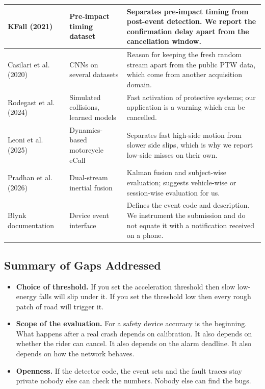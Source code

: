 \documentclass[10pt,a4paper]{article}
\begin{document}
\begin{longtable}{|>{\raggedright\arraybackslash}p{.19\linewidth}|>{\raggedright\arraybackslash}p{.23\linewidth}|>{\raggedright\arraybackslash}p{.49\linewidth}|}
KFall (2021)~\cite{kfall} & Pre-impact timing dataset & Separates pre-impact timing from post-event detection. We report the confirmation delay apart from the cancellation window.\\\hline
Casilari et al. (2020)~\cite{cnn} & CNNs on several datasets & Reason for keeping the fresh random stream apart from the public PTW data, which come from another acquisition domain.\\\hline
Rodegast et al. (2024)~\cite{rodegast2024} & Simulated collisions, learned models & Fast activation of protective systems; our application is a warning which can be cancelled.\\\hline
Leoni et al. (2025)~\cite{ecall2025} & Dynamics-based motorcycle eCall & Separates fast high-side motion from slower side slips, which is why we report low-side misses on their own.\\\hline
Pradhan et al. (2026)~\cite{dual2026} & Dual-stream inertial fusion & Kalman fusion and subject-wise evaluation; suggests vehicle-wise or session-wise evaluation for us.\\\hline
Blynk documentation~\cite{blynkevents} & Device event interface & Defines the event code and description. We instrument the submission and do not equate it with a notification received on a phone.\\\hline
\end{longtable}
\normalsize

\subsection*{Summary of Gaps Addressed}

\begin{itemize}
\item \textbf{Choice of threshold.} If you set the acceleration threshold then slow low-energy falls will slip under it. If you set the threshold low then every rough patch of road will trigger it.
\item \textbf{Scope of the evaluation.} For a safety device accuracy is the beginning. What happens after a real crash depends on calibration. It also depends on whether the rider can cancel. It also depends on the alarm deadline. It also depends on how the network behaves.
\item \textbf{Openness.} If the detector code, the event sets and the fault traces stay private nobody else can check the numbers. Nobody else can find the bugs.
\end{itemize}
\end{document}
